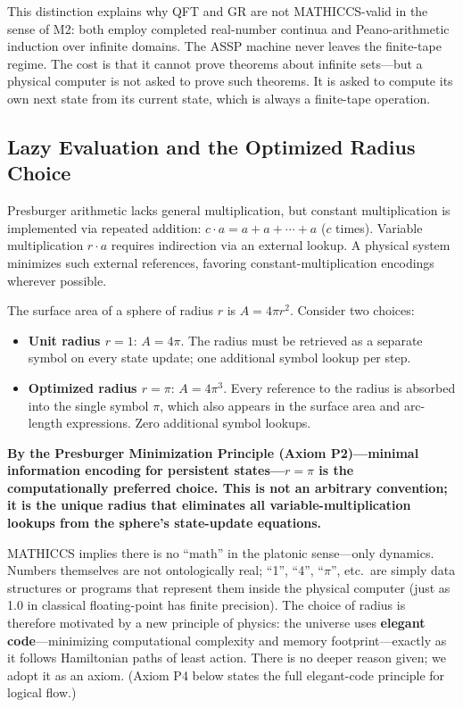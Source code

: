 \documentclass[11pt,a4paper]{article}
\begin{document}
This distinction explains why QFT and GR are not MATHICCS-valid in the sense of M2: both employ completed real-number continua and Peano-arithmetic induction over infinite domains. The ASSP machine never leaves the finite-tape regime. The cost is that it cannot prove theorems about infinite sets---but a physical computer is not asked to prove such theorems. It is asked to compute its own next state from its current state, which is always a finite-tape operation.

\subsection{Lazy Evaluation and the Optimized Radius Choice}

Presburger arithmetic lacks general multiplication, but constant multiplication is implemented via repeated addition: $c \cdot a = a + a + \cdots + a$ ($c$ times). Variable multiplication $r \cdot a$ requires indirection via an external lookup. A physical system minimizes such external references, favoring constant-multiplication encodings wherever possible.

The surface area of a sphere of radius $r$ is $A = 4\pi r^2$. Consider two choices:

\begin{itemize}
  \item \textbf{Unit radius $r=1$}: $A=4\pi$. The radius must be retrieved as a separate symbol on every state update; one additional symbol lookup per step.
  \item \textbf{Optimized radius $r=\pi$}: $A=4\pi^3$. Every reference to the radius is absorbed into the single symbol $\pi$, which also appears in the surface area and arc-length expressions. Zero additional symbol lookups.
\end{itemize}

\textbf{By the Presburger Minimization Principle (Axiom P2)---minimal information encoding for persistent states---$r = \pi$ is the computationally preferred choice. This is not an arbitrary convention; it is the unique radius that eliminates all variable-multiplication lookups from the sphere's state-update equations.}

MATHICCS implies there is no ``math'' in the platonic sense---only dynamics. Numbers themselves are not ontologically real; ``1'', ``4'', ``$\pi$'', etc.\ are simply data structures or programs that represent them inside the physical computer (just as 1.0 in classical floating-point has finite precision). The choice of radius is therefore motivated by a new principle of physics: the universe uses \textbf{elegant code}---minimizing computational complexity and memory footprint---exactly as it follows Hamiltonian paths of least action. There is no deeper reason given; we adopt it as an axiom. (Axiom P4 below states the full elegant-code principle for logical flow.)
\end{document}

